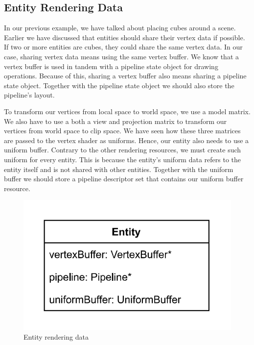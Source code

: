 \subsection{Entity Rendering Data}

In our previous example, we have talked about placing cubes around a scene.
Earlier we have discussed that entities should share their vertex data if possible.
If two or more entities are cubes, they could share the same vertex data.
In our case, sharing vertex data means using the same vertex buffer.
We know that a vertex buffer is used in tandem with a pipeline state object for
drawing operations.
Because of this, sharing a vertex buffer also means sharing a pipeline state
object.
Together with the pipeline state object we should also store the pipeline's layout.

To transform our vertices from local space to world space, we use a model matrix.
We also have to use a both a view and projection matrix to transform our vertices
from world space to clip space.
We have seen how these three matrices are passed to the vertex shader as uniforms.
Hence, our entity also needs to use a uniform buffer.
Contrary to the other rendering resources, we must create such uniform for every
entity.
This is because the entity's uniform data refers to the entity itself and is not
shared with other entities.
Together with the uniform buffer we should store a pipeline descriptor set that
contains our uniform buffer resource.

\begin{figure}[ht]
    \centering
    \includegraphics[scale=0.40]{images/ChScene/EntityRenderingData.png}
    \caption{Entity rendering data}
    \label{fig::EntityRenderingData}
\end{figure}


